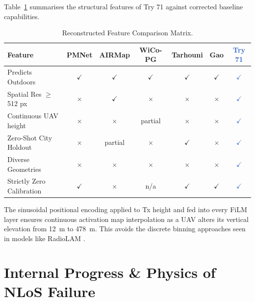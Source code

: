 \documentclass[11pt,a4paper]{article}
\newcommand{\ours}[1]{\textcolor{highlight}{\textbf{#1}}}
\newcommand{\yes}{$\checkmark$}
\newcommand{\no}{$\times$}
\begin{document}
Table~\ref{tab:novelty} summarises the structural features of Try 71 against corrected baseline capabilities. 

\begin{table}[h!]
\centering
\caption{Reconstructed Feature Comparison Matrix.}
\label{tab:novelty}
\small
\begin{tabular}{lcccccc}
\toprule
\textbf{Feature} & \textbf{PMNet} & \textbf{AIRMap} & \textbf{WiCo-PG}
    & \textbf{Tarhouni} & \textbf{Gao} & \ours{\textbf{Try 71}} \\
\midrule
Predicts Outdoors & \yes & \yes & \yes & \yes & \yes & \ours{\yes} \\
Spatial Res $\ge$ 512 px & \no & \yes & \no & \no & \no & \ours{\yes} \\
Continuous UAV height & \no & \no & partial & \no & \no & \ours{\yes} \\
Zero-Shot City Holdout & \no & partial & \no & \yes & \no & \ours{\yes} \\
Diverse Geometries & \no & \no & \no & \no & \no & \ours{\yes} \\
Strictly Zero Calibration & \yes & \no & n/a & \yes & \yes & \ours{\yes} \\
\bottomrule
\end{tabular}
\end{table}

The sinusoidal positional encoding applied to Tx height and fed into every FiLM layer ensures continuous activation map interpolation as a UAV alters its vertical elevation from 12~m to 478~m. This avoids the discrete binning approaches seen in models like RadioLAM \cite{radiolam2025}.

\section{Internal Progress \& Physics of NLoS Failure}
\label{sec:progress}
\end{document}
